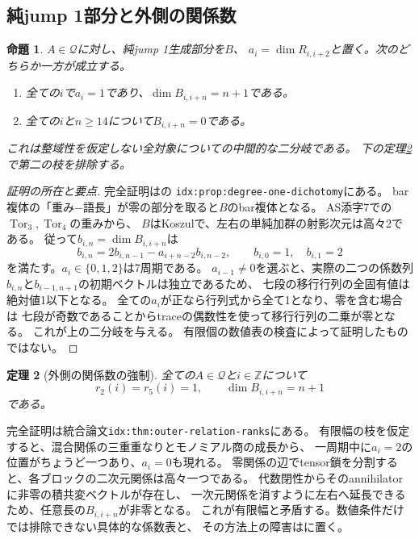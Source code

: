 \documentclass[11pt,a4paper]{ltjsarticle}
\newtheorem{theorem}{定理}[section]
\newtheorem{proposition}[theorem]{命題}
\theoremstyle{definition}
\newcommand{\ZZ}{\mathbb Z}
\begin{document}
\subsection{純jump 1部分と外側の関係数}
\begin{proposition}\label{prop:degree-one-dichotomy}
$A\in\mathcal Q$に対し、純jump 1生成部分を$B$、
$a_i=\dim R_{i,i+2}$と置く。次のどちらか一方が成立する。
\begin{enumerate}
\item 全ての$i$で$a_i=1$であり、$\dim B_{i,i+n}=n+1$である。
\item 全ての$i$と$n\geq14$について$B_{i,i+n}=0$である。
\end{enumerate}
これは整域性を仮定しない全対象についての中間的な二分岐である。
下の定理\ref{thm:outer-relation-ranks}で第二の枝を排除する。
\end{proposition}
\begin{proof}[証明の所在と要点]
完全証明はの
\texttt{idx:prop:degree-one-dichotomy}にある。
bar複体の「重み$-$語長」が零の部分を取ると$B$のbar複体となる。
AS添字7での$\operatorname{Tor}_3,\operatorname{Tor}_4$の重みから、
$B$はKoszulで、左右の単純加群の射影次元は高々2である。
従って$b_{i,n}=\dim B_{i,i+n}$は
\[
b_{i,n}=2b_{i,n-1}-a_{i+n-2}b_{i,n-2},
\qquad b_{i,0}=1,\quad b_{i,1}=2
\]
を満たす。$a_i\in\{0,1,2\}$は7周期である。
$a_{i-1}\ne0$を選ぶと、実際の二つの係数列
$b_{i,n}$と$b_{i-1,n+1}$の初期ベクトルは独立であるため、
七段の移行行列の全固有値は絶対値1以下となる。
全ての$a_i$が正なら行列式から全て1となり、零を含む場合は
七段が奇数であることからtraceの偶数性を使って移行行列の二乗が零となる。
これが上の二分岐を与える。
有限個の数値表の検査によって証明したものではない。
\end{proof}
\begin{theorem}[外側の関係数の強制]\label{thm:outer-relation-ranks}
全ての$A\in\mathcal Q$と$i\in\ZZ$について
\[
r_2(i)=r_5(i)=1,\qquad \dim B_{i,i+n}=n+1
\]
である。
\end{theorem}
完全証明は統合論文\texttt{idx:thm:outer-relation-ranks}にある。
有限幅の枝を仮定すると、混合関係の三重重なりとモノミアル商の成長から、
一周期中に$a_i=2$の位置がちょうど一つあり、$a_i=0$も現れる。
零関係の辺でtensor鎖を分割すると、各ブロックの二次元関係は高々一つである。
代数閉性からそのannihilatorに非零の積共変ベクトルが存在し、
一次元関係を消すように左右へ延長できるため、任意長の$B_{i,i+n}$が非零となる。
これが有限幅と矛盾する。数値条件だけでは排除できない具体的な係数表と、
その方法上の障害はに置く。
\end{document}
